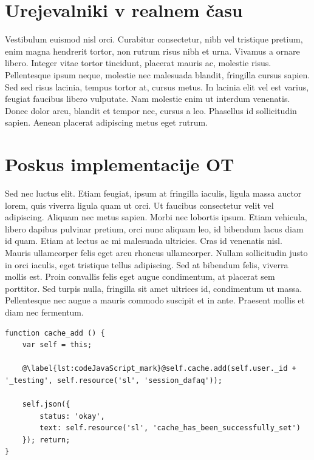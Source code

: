 \documentclass[a4paper, 12pt, twoside]{book}
\begin{document}
\chapter{Urejevalniki v realnem času}

Vestibulum euismod nisl orci. Curabitur consectetur, nibh vel tristique pretium, enim magna hendrerit tortor, non rutrum risus nibh et urna. Vivamus a ornare libero. Integer vitae tortor tincidunt, placerat mauris ac, molestie risus. Pellentesque ipsum neque, molestie nec malesuada blandit, fringilla cursus sapien. Sed sed risus lacinia, tempus tortor at, cursus metus. In lacinia elit vel est varius, feugiat faucibus libero vulputate. Nam molestie enim ut interdum venenatis. Donec dolor arcu, blandit et tempor nec, cursus a leo. Phasellus id sollicitudin sapien. Aenean placerat adipiscing metus eget rutrum.

\chapter{Poskus implementacije OT}

Sed nec luctus elit. Etiam feugiat, ipsum at fringilla iaculis, ligula massa auctor lorem, quis viverra ligula quam ut orci. Ut faucibus consectetur velit vel adipiscing. Aliquam nec metus sapien. Morbi nec lobortis ipsum. Etiam vehicula, libero dapibus pulvinar pretium, orci nunc aliquam leo, id bibendum lacus diam id quam. Etiam at lectus ac mi malesuada ultricies. Cras id venenatis nisl. Mauris ullamcorper felis eget arcu rhoncus ullamcorper. Nullam sollicitudin justo in orci iaculis, eget tristique tellus adipiscing. Sed at bibendum felis, viverra mollis est. Proin convallis felis eget augue condimentum, at placerat sem porttitor. Sed turpis nulla, fringilla sit amet ultrices id, condimentum ut massa. Pellentesque nec augue a mauris commodo suscipit et in ante. Praesent mollis et diam nec fermentum.

\begin{lstlisting}[caption={Interdum pretium}, label={lst:codeJavaScript}, title={Exampelus \ref{lst:codeJavaScript}: Interdum pretium}]
function cache_add () {
	var self = this;

	@\label{lst:codeJavaScript_mark}@self.cache.add(self.user._id + '_testing', self.resource('sl', 'session_dafaq'));

	self.json({
		status: 'okay',
		text: self.resource('sl', 'cache_has_been_successfully_set')
	}); return;
}
\end{lstlisting}
\end{document}
